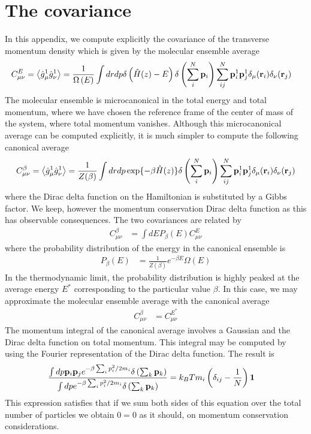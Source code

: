 \documentclass[a4paper,openright,12pt]{book}
\newcommand{\llangle}{\left\langle}
\newcommand{\rrangle}{\right\rangle}
\begin{document}
\chapter{The covariance}
\label{Ap:Cov}
In  this  appendix,  we  compute   explicitly  the  covariance  of  the
transverse momentum density  which is given by  the molecular ensemble
average
\begin{align}
  C_{\mu\nu}^E&=\llangle \hat{g}_\mu^1\hat{g}_\nu^1\rrangle
=\frac{1}{\Omega\left(E\right)}
\int dr dp \delta\left(\hat{H}(z)-E\right)
\delta\left(\sum_i^N{\bf p}_i\right) 
\sum_{ij}^N{\bf p}_i^1{\bf p}_j^1\delta_{\mu}({\bf r}_i) 
\delta_{\nu}({\bf r}_j) 
\end{align}
The molecular ensemble is microcanonical in the total energy and total
momentum, where  we have chosen the  reference frame of the  center of
mass  of the  system, where  total momentum  vanishes.  Although  this
microcanonical average can be computed  explicitly, it is much simpler
to compute the following canonical average
\begin{align}
  C_{\mu\nu}^\beta =\llangle \hat{g}_\mu^1\hat{g}_\nu^1\rrangle
=\frac{1}{Z(\beta)}
\int dr dp \exp\{-\beta\hat{H}(z)\}
\delta\left(\sum_i^N{\bf p}_i\right) 
\sum_{ij}^N{\bf p}_i^1{\bf p}_j^1\delta_{\mu}({\bf r}_i) 
\delta_{\nu}({\bf r}_j) 
\end{align}
where the Dirac delta function on  the Hamiltonian is substituted by a
Gibbs factor. We  keep, however the momentum  conservation Dirac delta
function as this has observable consequences.  The two covariances are
related by
\begin{align}
  C^{\beta}_{\mu\nu}&=\int dE P_\beta(E)
  C^{E}_{\mu\nu}
\end{align}
where the probability distribution of the energy in the canonical ensemble is
\begin{align}
P_\beta(E)&=  \frac{1}{Z(\beta)}e^{-\beta E}\Omega(E)
\end{align}
In the thermodynamic limit, the probability distribution is highly peaked
at the average energy $E^*$ corresponding to the particular value $\beta$. In this case, we may approximate the molecular
ensemble average with the canonical average
\begin{align}
  C^{\beta}_{\mu\nu}&=  C^{E^*}_{\mu\nu}
\end{align}
The momentum integral of the canonical average involves a Gaussian and the
Dirac delta function on total momentum. This integral may be computed by
using the Fourier representation of the Dirac delta function. The result
is
\begin{align}
  \frac{\int dp {\bf p}_i{\bf p}_je^{-\beta\sum_ip_i^2/2m_i}
\delta\left(\sum_k{\bf p}_k\right)}{\int dp e^{-\beta\sum_ip_i^2/2m_i}
\delta\left(\sum_k{\bf p}_k\right)}&=k_BT m_i\left(\delta_{ij}-\frac{1}{N}\right){\bf 1}
\label{momint}\end{align}
This expression satisfies  that if we sum both sides  of this equation
over the  total number of particles  we obtain $0=0$ as  it should, on
momentum conservation considerations.
\end{document}
